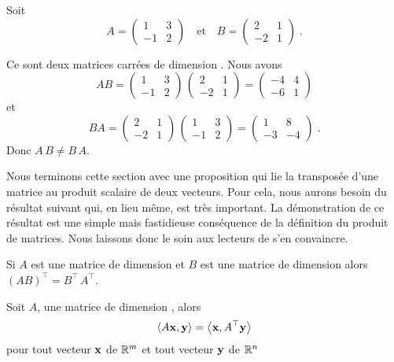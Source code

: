 {\begin{egg}
Soit
\[
A=\begin{pmatrix} 1 & 3 \\ -1 & 2 \end{pmatrix} \quad \text{et} 
\quad
B=\begin{pmatrix} 2 & 1 \\ -2 & 1 \end{pmatrix} \; .
\]

Ce sont deux matrices carrées de dimension .  Nous avons
\[
AB = \begin{pmatrix} 1 & 3 \\ -1 & 2 \end{pmatrix} \,
\begin{pmatrix} 2 & 1 \\ -2 & 1 \end{pmatrix}
= \begin{pmatrix} -4 & 4 \\ -6 & 1 \end{pmatrix}
\]
et
\[
BA = \begin{pmatrix} 2 & 1 \\ -2 & 1 \end{pmatrix} \,
\begin{pmatrix} 1 & 3 \\ -1 & 2 \end{pmatrix}
= \begin{pmatrix} 1 & 8 \\ -3 & -4 \end{pmatrix} \; .
\]
Donc $A\,B \neq B \, A$.
\end{egg}

Nous terminons cette section avec une proposition qui lie la transposée
d'une matrice au produit scalaire de deux vecteurs.  Pour cela, nous
aurons besoin du résultat suivant qui, en lieu même, est très
important.  La démonstration de ce résultat est une simple mais
fastidieuse conséquence de la définition du produit de matrices.  Nous
laissons donc le soin aux lecteurs de s'en convaincre.

\begin{prop} \label{transpAB}
Si $A$ est une matrice de dimension  et $B$ est une matrice
de dimension  alors $(AB)^\top = B^\top\, A^\top$.
\end{prop}

\begin{prop}
Soit $A$, une matrice de dimension , alors
\[
\left\langle{A\mathbf{x}} , {\mathbf{y}}\right\rangle = \left\langle{\mathbf{x}} , {A^\top\mathbf{y}}\right\rangle
\]
pour tout vecteur $\mathbf{x}$ de $\mathbb{R}^m$ et tout vecteur $\mathbf{y}$ de
$\mathbb{R}^n$
\end{prop}

}
